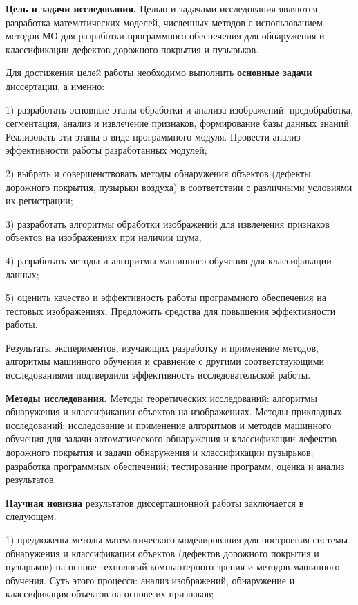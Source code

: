 \textbf{Цель и задачи исследования.} Целью и задачами исследования являются разработка математических моделей, численных методов с использованием методов МО для разработки программного обеспечения для обнаружения и классификации дефектов дорожного покрытия и пузырьков. 

	Для достижения целей работы необходимо выполнить \textbf{основные задачи} диссертации, а именно:
 
1) разработать основные этапы обработки и анализа изображений: предобработка, сегментация, анализ и извлечение признаков, формирование базы данных знаний. Реализовать эти этапы в виде программного модуля. Провести анализ эффективности работы разработанных модулей;
	
2) выбрать и совершенствовать методы обнаружения объектов (дефекты дорожного покрытия, пузырьки воздуха) в соответствии с различными условиями их регистрации;
	
3) разработать алгоритмы обработки изображений для извлечения признаков объектов на изображениях при наличии шума;
	
4) разработать методы и алгоритмы машинного обучения для классификации данных;
	
5) оценить качество и эффективность работы программного обеспечения на тестовых изображениях. Предложить средства для повышения эффективности работы.
 
Результаты экспериментов, изучающих разработку и применение методов, алгоритмы машинного обучения и сравнение с другими соответствующими исследованиями подтвердили эффективность исследовательской работы.


\textbf{Методы исследования.} Методы теоретических исследований: алгоритмы обнаружения и классификации объектов на изображениях. Методы прикладных исследований: исследование и применение алгоритмов и методов машинного обучения для  задачи автоматического обнаружения и классификации дефектов дорожного покрытия и задачи обнаружения и классификации пузырьков; разработка программных обеспечений; тестирование программ, оценка и анализ результатов.

\textbf{Научная новизна} результатов диссертационной работы заключается в следующем:

1) предложены методы математического моделирования для построения системы обнаружения и классификации объектов (дефектов дорожного покрытия и пузырьков) на основе технологий компьютерного зрения и методов машинного обучения. Суть этого процесса: анализ изображений, обнаружение и классификация объектов на основе их признаков;

